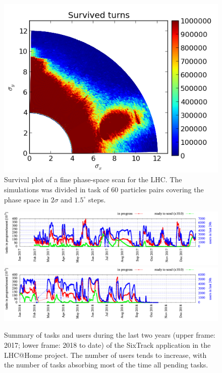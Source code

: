 \documentclass[a4paper,
              ]{jacow}
\begin{document}
\begin{figure}[tbh]
\centering
 \includegraphics[width=\columnwidth]{surv_plot1.png}
 \caption{Survival plot of a fine phase-space scan for the LHC. The simulations was divided in task of $60$ particles pairs covering the phase space in $2\sigma$ and $1.5^\circ$ steps.}
 \label{fig:study}
\end{figure}

\begin{figure}[tbh]
\centering
 \includegraphics[width=\textwidth]{sixtrackOverview_2017.png}
 \includegraphics[width=\textwidth]{sixtrackOverview_2018.png}
  \caption{Summary of tasks and users during the last two years (upper frame: 2017; lower frame: 2018 to date) of the SixTrack application in the LHC@Home project. The number of users tends to increase, with the number of tasks absorbing most of the time all pending tasks.}
 \label{fig:boinc}
\end{figure}
\end{document}
